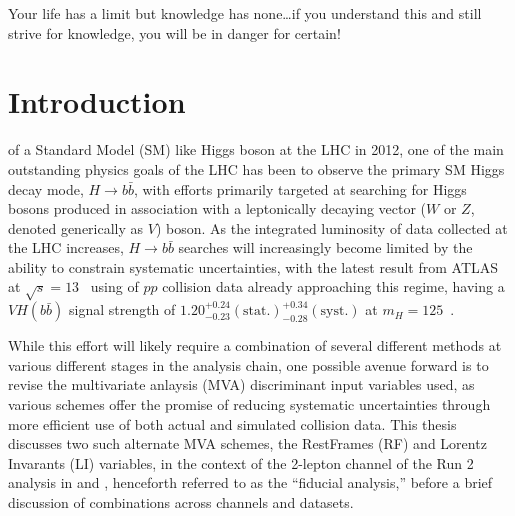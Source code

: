 \begin{savequote}[75mm]
Your life has a limit but knowledge has none\ldots if you understand this and still strive for knowledge, you will be in danger for certain!
\end{savequote}

\chapter{Introduction}

 of a Standard Model (SM) like Higgs boson at the LHC in 2012\cite{:2012gk}\cite{:2012gu}, one of the main outstanding physics goals of the LHC has been to observe the primary SM Higgs decay mode, $H\to b\bar{b}$, with efforts primarily targeted at searching for Higgs bosons produced in association with a leptonically decaying vector ($W$ or $Z$, denoted generically as $V$) boson.  As the integrated luminosity of data collected at the LHC increases, $H\to b\bar{b}$ searches will increasingly become limited by the ability to constrain systematic uncertainties, with the latest result from ATLAS at $\sqrt{s}=13$ \TeV\, using \LUMI of $pp$ collision data already approaching this regime, having a $VH\left(b\bar{b}\right)$ signal strength of $1.20^{+0.24}_{-0.23}(\textrm{stat.})^{+0.34}_{-0.28}(\textrm{syst.})$ at $m_{H}=125$ \GeV\,\cite{paper}.

While this effort will likely require a combination of several different methods at various different stages in the analysis chain, one possible avenue forward is to revise the multivariate anlaysis (MVA) discriminant input variables used, as various schemes offer the promise of reducing systematic uncertainties through more efficient use of both actual and simulated collision data.  This thesis discusses two such alternate MVA schemes, the RestFrames (RF) and Lorentz Invarants (LI) variables, in the context of the 2-lepton channel of the Run 2 analysis in \cite{paper} and \cite{supportnote}, henceforth referred to as the ``fiducial analysis,'' before a brief discussion of combinations across channels and datasets.



